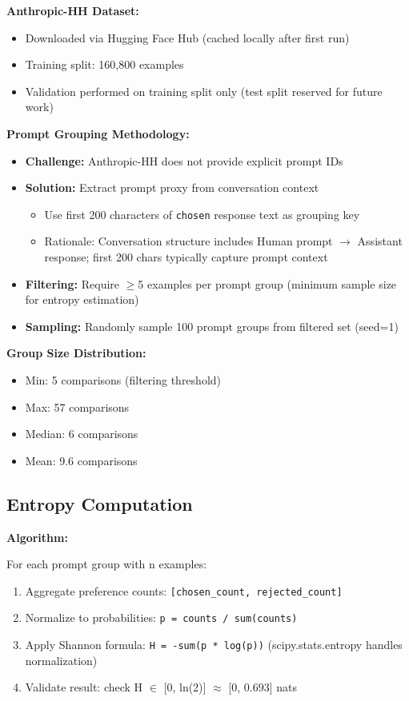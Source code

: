 \textbf{Anthropic-HH Dataset:}
\begin{itemize}
\item Downloaded via Hugging Face Hub (cached locally after first run)
\item Training split: 160,800 examples
\item Validation performed on training split only (test split reserved for future work)
\end{itemize}

\textbf{Prompt Grouping Methodology:}
\begin{itemize}
\item \textbf{Challenge:} Anthropic-HH does not provide explicit prompt IDs
\item \textbf{Solution:} Extract prompt proxy from conversation context
  \begin{itemize}
  \item Use first 200 characters of \texttt{chosen} response text as grouping key
  \item Rationale: Conversation structure includes Human prompt $\rightarrow$ Assistant response; first 200 chars typically capture prompt context
  \end{itemize}
\item \textbf{Filtering:} Require $\geq$5 examples per prompt group (minimum sample size for entropy estimation)
\item \textbf{Sampling:} Randomly sample 100 prompt groups from filtered set (seed=1)
\end{itemize}

\textbf{Group Size Distribution:}
\begin{itemize}
\item Min: 5 comparisons (filtering threshold)
\item Max: 57 comparisons
\item Median: 6 comparisons
\item Mean: 9.6 comparisons
\end{itemize}

\subsection{Entropy Computation}

\textbf{Algorithm:}

For each prompt group with n examples:
\begin{enumerate}
\item Aggregate preference counts: \texttt{[chosen\_count, rejected\_count]}
\item Normalize to probabilities: \texttt{p = counts / sum(counts)}
\item Apply Shannon formula: \texttt{H = -sum(p * log(p))} (scipy.stats.entropy handles normalization)
\item Validate result: check H $\in$ [0, ln(2)] $\approx$ [0, 0.693] nats
\end{enumerate}


